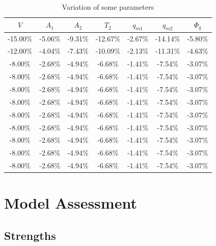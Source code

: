 \documentclass{mcmthesis}
\begin{document}
\begin{table}[h] %
\centering  %
\caption{Variation of some parameters}  %
\label{tab7} %
\begin{tabular}{ccccccc} %
\toprule  %
$V$      & $A_1$   & $A_2$   & $T_2$    & $q_{m1}$ & $q_{m2}$ & $\Phi_q$ \\
\midrule  %
-15.00\% & -5.06\% & -9.31\% & -12.67\% & -2.67\%  & -14.14\% & -5.80\% \\
-12.00\% & -4.04\% & -7.43\% & -10.09\% & -2.13\%  & -11.31\% & -4.63\% \\
-8.00\%  & -2.68\% & -4.94\% & -6.68\%  & -1.41\%  & -7.54\%  & -3.07\% \\
-8.00\%  & -2.68\% & -4.94\% & -6.68\%  & -1.41\%  & -7.54\%  & -3.07\% \\
-8.00\%  & -2.68\% & -4.94\% & -6.68\%  & -1.41\%  & -7.54\%  & -3.07\% \\
-8.00\%  & -2.68\% & -4.94\% & -6.68\%  & -1.41\%  & -7.54\%  & -3.07\% \\
-8.00\%  & -2.68\% & -4.94\% & -6.68\%  & -1.41\%  & -7.54\%  & -3.07\% \\
-8.00\%  & -2.68\% & -4.94\% & -6.68\%  & -1.41\%  & -7.54\%  & -3.07\% \\
-8.00\%  & -2.68\% & -4.94\% & -6.68\%  & -1.41\%  & -7.54\%  & -3.07\% \\
-8.00\%  & -2.68\% & -4.94\% & -6.68\%  & -1.41\%  & -7.54\%  & -3.07\% \\
-8.00\%  & -2.68\% & -4.94\% & -6.68\%  & -1.41\%  & -7.54\%  & -3.07\% \\
\bottomrule  %
\end{tabular}
\end{table}

\section{Model Assessment}

\subsection{Strengths}
\end{document}
